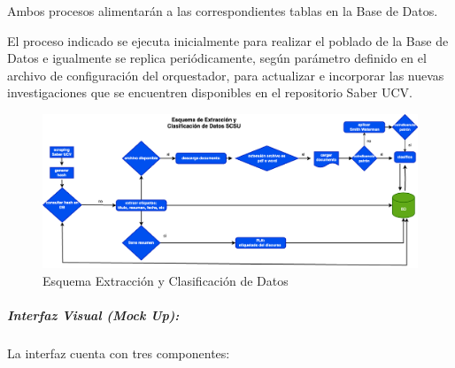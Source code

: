 \documentclass[
  12pt,
  openany]{book}
\begin{document}
Ambos procesos alimentarán a las correspondientes tablas en la Base de Datos.

El proceso indicado se ejecuta inicialmente para realizar el poblado de la Base de Datos e igualmente se replica periódicamente, según parámetro definido en el archivo de configuración del orquestador, para actualizar e incorporar las nuevas investigaciones que se encuentren disponibles en el repositorio Saber UCV.

\begin{figure}

{\centering \includegraphics[width=0.9\linewidth]{images/05-desarrollo/4_ciclo/esquema extraccion} 

}

\caption{Esquema Extracción y Clasificación de Datos}\label{fig:diagramaextra}
\end{figure}

\hypertarget{interfaz-visual-mock-up}{%
\subparagraph{Interfaz Visual (Mock Up):}\label{interfaz-visual-mock-up}}

La interfaz cuenta con tres componentes:
\end{document}
